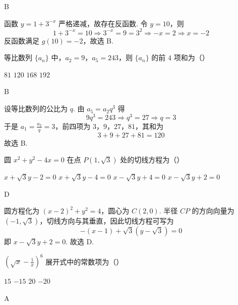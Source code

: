 \begin{answer}
B
\end{answer}

\begin{solution}
函数 \(y=1+3^{-x}\) 严格递减，故存在反函数. 令 \(y=10\)，则
\[
1+3^{-x}=10\Longrightarrow 3^{-x}=9=3^2\Longrightarrow -x=2\Longrightarrow x=-2
\]
反函数满足 \(g(10)=-2\)，故选 B.
\end{solution}

\begin{problem}
等比数列 \(\{a_{n}\}\) 中，\(a_{2} = 9\)，\(a_{5} = 243\)，则 \(\{a_{n}\}\) 的前 \(4\) 项和为（\quad）

\choices
    {\(81\)}
    {\(120\)}
    {\(168\)}
    {\(192\)}
\end{problem}

\begin{answer}
B
\end{answer}

\begin{solution}
设等比数列的公比为 \(q\). 由 \(a_5=a_2q^3\) 得
\[
9q^3=243\Longrightarrow q^3=27\Longrightarrow q=3
\]
于是 \(a_1=\frac{a_2}{q}=3\)，前四项为 \(3\)，\(9\)，\(27\)，\(81\)，其和为
\[
3+9+27+81=120
\]
故选 B.
\end{solution}

\begin{problem}
圆 \(x^{2} + y^{2} - 4x = 0\) 在点 \(P(1, \sqrt{3})\) 处的切线方程为（\quad）

\choices
    {\(x + \sqrt{3} y - 2 = 0\)}
    {\(x + \sqrt{3} y - 4 = 0\)}
    {\(x - \sqrt{3} y + 4 = 0\)}
    {\(x - \sqrt{3} y + 2 = 0\)}
\end{problem}

\begin{answer}
D
\end{answer}

\begin{solution}
圆方程化为 \((x-2)^2+y^2=4\)，圆心为 \(C(2,0)\). 半径 \(CP\) 的方向向量为 \((-1,\sqrt{3})\)，切线方向与其垂直，因此切线方程可写为
\[
-(x-1)+\sqrt{3}(y-\sqrt{3})=0
\]
即 \(x-\sqrt{3}y+2=0\). 故选 D.
\end{solution}

\begin{problem}
\(\left(\sqrt{x} -\frac{1}{x}\right)^6\) 展开式中的常数项为（\quad）

\choices
    {\(15\)}
    {\(-15\)}
    {\(20\)}
    {\(-20\)}
\end{problem}

\begin{answer}
A
\end{answer}

